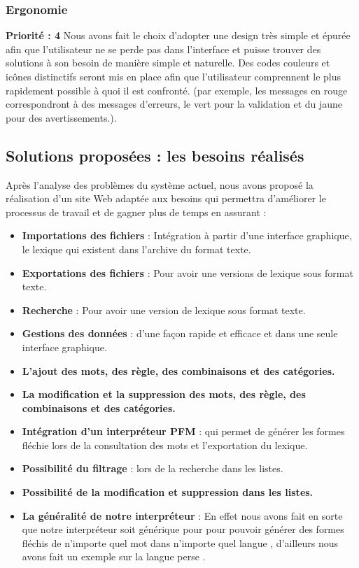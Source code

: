 \documentclass[12pt,a4paper]{article}
\begin{document}
\subsubsection{Ergonomie}
\textbf{Priorité : 4}
\smallbreak
Nous avons fait le choix d'adopter une design très simple et épurée afin que l'utilisateur ne se perde pas dans l'interface et puisse trouver des solutions à son besoin de manière simple et naturelle.
\smallbreak
Des codes couleurs et icônes distinctifs seront mis en place afin que l'utilisateur comprennent le plus rapidement possible à quoi il est confronté. (par exemple, les messages en rouge correspondront à des messages d'erreurs, le vert pour la validation et du jaune pour des avertissements.).

\subsection{Solutions proposées : les besoins réalisés}

Après l'analyse des problèmes du système actuel, nous avons proposé la réalisation d'un site Web  adaptée aux besoins 
qui permettra d'améliorer le processus de travail et de gagner plus de temps en assurant :

\begin{itemize}
\item \textbf{Importations des fichiers} : Intégration à partir d'une interface graphique, le lexique qui existent dans l'archive du format texte.
\item \textbf{Exportations des fichiers} : Pour avoir une versions de lexique sous format texte.
\item \textbf{Recherche} : Pour avoir une version de lexique sous format texte.
\item \textbf{Gestions des données} : d'une façon rapide et efficace et dans une seule interface graphique.


\item \textbf{L'ajout des mots, des règle, des combinaisons et des catégories.}


\item \textbf{ La modification et la suppression des mots, des règle, des combinaisons et des catégories.}
\item \textbf{Intégration d'un interpréteur PFM } : qui permet de générer les formes fléchie lors de la consultation des mots et l'exportation du lexique.
\item \textbf{Possibilité du filtrage} : lors de la recherche dans les listes.
\item \textbf{Possibilité de la modification et suppression dans les listes.}
\item \textbf{La généralité de notre interpréteur} : En effet nous avons fait en sorte que notre interpréteur soit générique pour pour pouvoir générer des formes fléchis de n'importe quel mot dans n'importe quel langue , d'ailleurs nous avons fait un exemple sur la langue perse .
\end{itemize}
\end{document}
